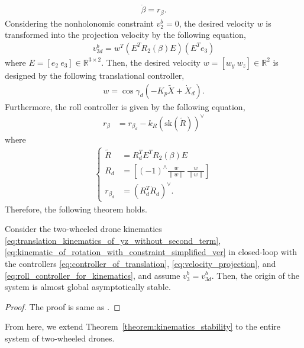 \begin{align}
    \label{eq:kinematics_of_roll}
    \dot{\beta} = r_{\beta}.
\end{align}
Considering the nonholonomic constraint $ v_2^b = 0 $, the desired velocity $ w $ is transformed into the projection velocity by the following equation,
\begin{align}
    \label{eq:velocity_projection}
    v_{3d}^b = w^T \left ( E^T R_2 \left (\beta \right ) E \right ) \left ( E^T e_3 \right )
\end{align}
where $ E = [e_2 ~ e_3] \in \mathbb{R}^{3 \times 2} $.
Then, the desired velocity $ w = [w_y ~ w_z] \in \mathbb{R}^2 $ is designed by the following translational controller,
\begin{align}
    \label{eq:controller_of_translation}
    w = \cos \gamma_d ( - K_p \tilde{X} + \dot{X}_d ).
\end{align}
Furthermore, the roll controller is given by the following equation,
\begin{align}
    \label{eq:roll_controller_for_kinematics}
    r_{\beta} &= r_{\beta_d} - k_R ( \mathrm{sk}(\tilde{R}))^{\vee}
\end{align}
where
\begin{align}
    \begin{cases}
    \tilde{R} &= R_d^T E^T R_2(\beta)E \\
    R_d &= \left [(-1)^{\wedge} \frac{w}{\|w\|} ~ \frac{w}{\|w\|} \right ] \\
    r_{\beta_d} &= (R_d^T \dot{R}_d)^{\vee}.
    \label{eq:definition_of_error_angular_velocity}
    \end{cases}
\end{align}
Therefore, the following theorem holds.
\begin{theorem}
    \label{theorem:kinematics_stability}
    Consider the two-wheeled drone kinematics \eqref{eq:translation_kinematics_of_yz_without_second_term}, \eqref{eq:kinematic_of_rotation_with_constraint_simplified_ver} in closed-loop with the controllers \eqref{eq:controller_of_translation}, \eqref{eq:velocity_projection}, and \eqref{eq:roll_controller_for_kinematics}, and assume $ v_3^b = v_{3d}^b $.
    Then, the origin of the system is almost global asymptotically stable.
\end{theorem}
\begin{proof}
    The proof is same as \cite{rodriguez-cortesNewGeometricTrajectory2022}.
\end{proof}
From here, we extend Theorem~\ref{theorem:kinematics_stability} to the entire system of two-wheeled drones.

